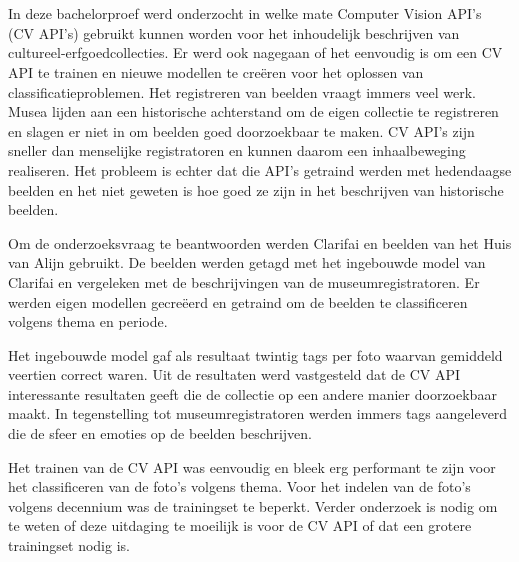 
%
%


\chapter*{}

In deze bachelorproef werd onderzocht in welke mate Computer Vision API's (CV API’s) gebruikt kunnen worden voor het inhoudelijk beschrijven van cultureel-erfgoedcollecties. Er werd ook nagegaan of het eenvoudig is om een CV API te trainen en nieuwe modellen te creëren voor het oplossen van classificatieproblemen. Het registreren van beelden vraagt immers veel werk. Musea lijden aan een historische achterstand om de eigen collectie te registreren en slagen er niet in om beelden goed doorzoekbaar te maken. CV API’s zijn sneller dan menselijke registratoren en kunnen daarom een inhaalbeweging realiseren. Het probleem is echter dat die API’s getraind werden met hedendaagse beelden en het niet geweten is hoe goed ze zijn in het beschrijven van historische beelden.

Om de onderzoeksvraag te beantwoorden werden Clarifai en beelden van het Huis van Alijn gebruikt. De beelden werden getagd met het ingebouwde model van Clarifai en vergeleken met de beschrijvingen van de museumregistratoren. Er werden eigen modellen gecreëerd en getraind om de beelden te classificeren volgens thema en periode.

Het ingebouwde model gaf als resultaat twintig tags per foto waarvan gemiddeld veertien correct waren. Uit de resultaten werd vastgesteld dat de CV API interessante resultaten geeft die de collectie op een andere manier doorzoekbaar maakt. In tegenstelling tot museumregistratoren werden immers tags aangeleverd die de sfeer en emoties op de beelden beschrijven. 

Het trainen van de CV API was eenvoudig en bleek erg performant te zijn voor het classificeren van de foto's volgens thema. Voor het indelen van de foto's volgens decennium was de trainingset te beperkt. Verder onderzoek is nodig om te weten of deze uitdaging te moeilijk is voor de CV API of dat een grotere trainingset nodig is. 


